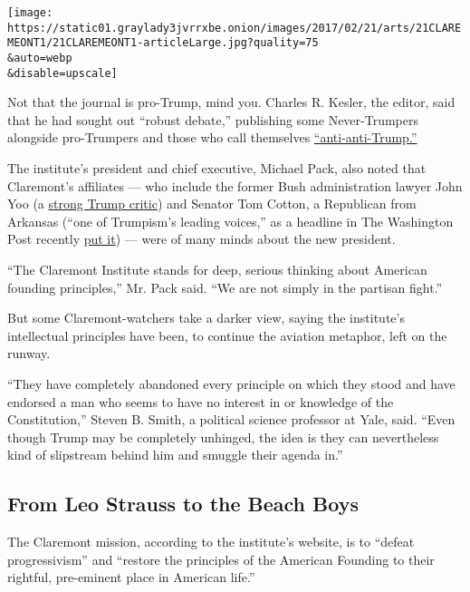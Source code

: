 \texttt{[image: https://static01.graylady3jvrrxbe.onion/images/2017/02/21/arts/21CLAREMEONT1/21CLAREMEONT1-articleLarge.jpg?quality=75\\\&auto=webp\\\&disable=upscale]}

Not that the journal is pro-Trump, mind you. Charles R. Kesler, the
editor, said that he had sought out ``robust debate,'' publishing some
Never-Trumpers alongside pro-Trumpers and those who call themselves
\href{http://www.claremont.org/crb/basicpage/the-reason-im-anti-anti-trump/}{``anti-anti-Trump.''}

The institute's president and chief executive, Michael Pack, also noted
that Claremont's affiliates --- who include the former Bush
administration lawyer John Yoo (a
\href{https://www.nytimes3xbfgragh.onion/2017/02/06/opinion/executive-power-run-amok.html}{strong
Trump critic}) and Senator Tom Cotton, a Republican from Arkansas (``one
of Trumpism's leading voices,'' as a headline in The Washington Post
recently
\href{https://www.washingtonpost.com/news/the-fix/wp/2017/02/07/how-tom-cotton-emerged-as-one-of-trumpisms-leading-voices/?utm_term=.df69e741f87a}{put
it}) --- were of many minds about the new president.

``The Claremont Institute stands for deep, serious thinking about
American founding principles,'' Mr. Pack said. ``We are not simply in
the partisan fight.''

But some Claremont-watchers take a darker view, saying the institute's
intellectual principles have been, to continue the aviation metaphor,
left on the runway.

``They have completely abandoned every principle on which they stood and
have endorsed a man who seems to have no interest in or knowledge of the
Constitution,'' Steven B. Smith, a political science professor at Yale,
said. ``Even though Trump may be completely unhinged, the idea is they
can nevertheless kind of slipstream behind him and smuggle their agenda
in.''

\hypertarget{from-leo-strauss-to-the-beach-boys}{%
\subsection{From Leo Strauss to the Beach
Boys}\label{from-leo-strauss-to-the-beach-boys}}

The Claremont mission, according to the institute's website, is to
``defeat progressivism'' and ``restore the principles of the American
Founding to their rightful, pre-eminent place in American life.''


